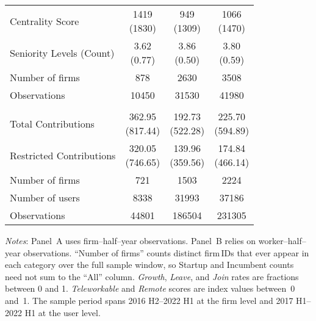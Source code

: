 \begin{table}[H]
\begin{threeparttable}
\begin{tabular}{lcc@{\hspace{6pt}}c}
Centrality Score & \makecell{1419 \\ (1830)} & \makecell{949 \\ (1309)} & \makecell{1066 \\ (1470)} \\
Seniority Levels (Count) & \makecell{3.62 \\ (0.77)} & \makecell{3.86 \\ (0.50)} & \makecell{3.80 \\ (0.59)} \\
\addlinespace
\midrule
Number of firms & 878 & 2630 & 3508 \\
Observations & 10450 & 31530 & 41980 \\
        \addlinespace
        \midrule
        \addlinespace
        \multicolumn{4}{l}{\textbf{\uline{Panel B: User-level}}}\\[0.3em]
        Total Contributions & \makecell{362.95 \\ (817.44)} & \makecell{192.73 \\ (522.28)} & \makecell{225.70 \\ (594.89)} \\
Restricted Contributions & \makecell{320.05 \\ (746.65)} & \makecell{139.96 \\ (359.56)} & \makecell{174.84 \\ (466.14)} \\
\addlinespace
\midrule
Number of firms & 721 & 1503 & 2224 \\
Number of users & 8338 & 31993 & 37186 \\
Observations & 44801 & 186504 & 231305 \\
        \bottomrule
        \end{tabular}
        \begin{tablenotes}[flushleft]
\footnotesize
\item \emph{Notes}: Panel~A uses firm--half--year observations. Panel~B relies on worker--half--year observations. ``Number of firms'' counts distinct firm\,IDs that ever appear in each category over the full sample window, so Startup and Incumbent counts need not sum to the ``All'' column. \textit{Growth}, \textit{Leave}, and \textit{Join} rates are fractions between 0 and 1. \textit{Teleworkable} and \textit{Remote} scores are index values between~0 and~1.  The sample period spans 2016 H2–2022 H1 at the firm level and 2017 H1–2022 H1 at the user level.
\end{tablenotes}
        \end{threeparttable}
        \end{table}
